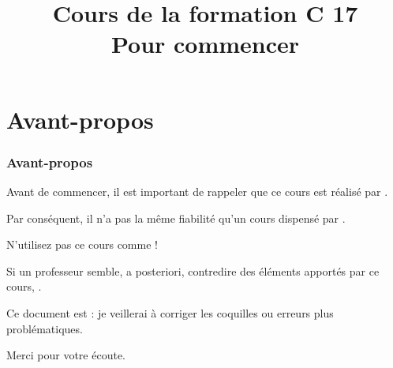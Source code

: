 \documentclass{ccourses}
\title[Formation C 17]{
    Cours \no 01 de la formation C 17 \\
    \small{Pour commencer}
}
\begin{document}
\frame{\titlepage}

\section{Avant-propos}

\begin{frame}

\frametitle{Avant-propos}

Avant de commencer, il est important de rappeler que ce cours est réalisé par .

Par conséquent, il n'a pas la même fiabilité qu'un cours dispensé par .

N'utilisez pas ce cours comme  !

Si un professeur semble, a posteriori, contredire des éléments apportés par ce cours, .

Ce document est  : je veillerai à corriger les coquilles ou erreurs plus problématiques.

\end{frame}

\begin{frame}

\centering\Large

Merci pour votre écoute.

\end{frame}
\end{document}
